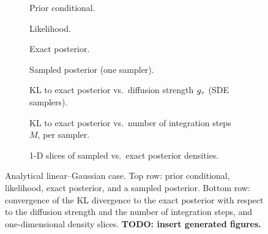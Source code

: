 \begin{figure}[ht]
    \centering
    \begin{subfigure}{0.24\linewidth}\centering
        \caption{Prior conditional.}\label{fig:an_prior}
    \end{subfigure}\hfill
    \begin{subfigure}{0.24\linewidth}\centering
        \caption{Likelihood.}\label{fig:an_like}
    \end{subfigure}\hfill
    \begin{subfigure}{0.24\linewidth}\centering
        \caption{Exact posterior.}\label{fig:an_true}
    \end{subfigure}\hfill
    \begin{subfigure}{0.24\linewidth}\centering
        \caption{Sampled posterior (one sampler).}\label{fig:an_sampled}
    \end{subfigure}

    \vspace{4pt}
    \begin{subfigure}{0.32\linewidth}\centering
        \caption{KL to exact posterior vs.\ diffusion strength $g_\tau$ (SDE samplers).}\label{fig:an_kl_diff}
    \end{subfigure}\hfill
    \begin{subfigure}{0.32\linewidth}\centering
        \caption{KL to exact posterior vs.\ number of integration steps $M$, per sampler.}\label{fig:an_kl_steps}
    \end{subfigure}\hfill
    \begin{subfigure}{0.32\linewidth}\centering
        \caption{1-D slices of sampled vs.\ exact posterior densities.}\label{fig:an_slices}
    \end{subfigure}
    \caption{Analytical linear--Gaussian case. Top row: prior conditional, likelihood, exact posterior, and a sampled posterior. Bottom row: convergence of the KL divergence to the exact posterior with respect to the diffusion strength and the number of integration steps, and one-dimensional density slices. \textbf{TODO: insert generated figures.}}
    \label{fig:analytical_panels}
\end{figure}

